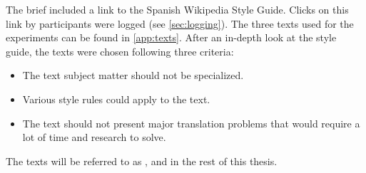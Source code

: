 The brief included a link to the Spanish Wikipedia Style Guide. Clicks on this link by participants were logged (see \autoref{sec:logging}). The three texts used for the experiments can be found in \autoref{app:texts}. After an in-depth look at the style guide, the texts were chosen following three criteria:

\begin{itemize}
\item The text subject matter should not be specialized.
\item Various style rules could apply to the text.
\item The text should not present major translation problems that would require a lot of time and research to solve.
\end{itemize}

The texts will be referred to as \ai, \charlotte and \garfield in the rest of this thesis.

